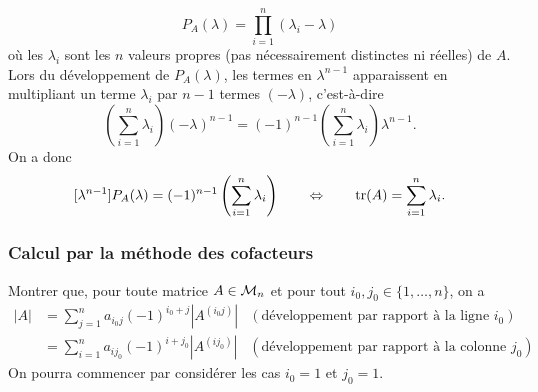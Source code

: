 \begin{enumerate}
{  $$
  P_A(\lambda) 
  = \prod_{i=1}^n (\lambda_i - \lambda)
  $$
  où les $\lambda_i$ sont les $n$ valeurs propres (pas nécessairement distinctes ni réelles) de $A$. Lors du développement de $P_A(\lambda)$, les termes en $\lambda^{n-1}$ apparaissent en multipliant un terme $\lambda_i$ par $n-1$ termes $(-\lambda)$, c'est-à-dire
  $$
  \left( \sum_{i=1}^n \lambda_i \right) (-\lambda)^{n-1}
  = (-1)^{n-1} \left( \sum_{i=1}^n \lambda_i \right) \lambda^{n-1}.
  $$
  On a donc
  $$
  [\lambda^{n-1}] P_A(\lambda) 
  = (-1)^{n-1} \left( \sum_{i=1}^n \lambda_i \right) 
  \qquad \Leftrightarrow \qquad
  \operatorname{tr}(A) = \sum_{i=1}^n \lambda_i.
  $$
  }
\end{enumerate}

 
\subsubsection{Calcul par la méthode des cofacteurs}
  Montrer que, pour toute matrice $A \in \mathcal{M}_n$ et pour tout $i_0, j_0 \in \{1, \dots, n\}$, on a 
  \begin{align*}
    |A| 
    & = \sum_{j=1}^n a_{i_0j} (-1)^{i_0+j} |A^{(i_0j)}| & (\text{développement par rapport à la ligne $i_0$}) \\
    & = \sum_{i=1}^n a_{ij_0} (-1)^{i+j_0} |A^{(ij_0)}| & (\text{développement par rapport à la colonne $j_0$})
  \end{align*}
  On pourra commencer par considérer les cas $i_0 = 1$ et $j_0 = 1$.

